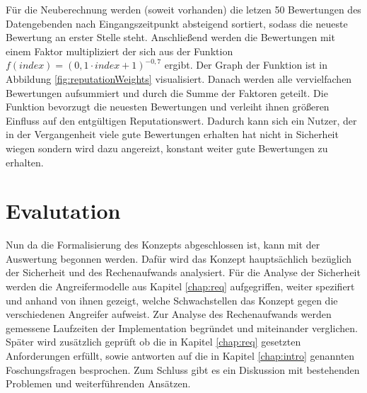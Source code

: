 \documentclass[
	fontsize=12pt,
	headings=small,
	parskip=half,           %
	bibliography=totoc,
	numbers=noenddot,       %
	open=any,               %
]{scrreprt}
\begin{document}
Für die Neuberechnung werden (soweit vorhanden) die letzen 50 Bewertungen des Datengebenden nach Eingangszeitpunkt absteigend sortiert, sodass die neueste Bewertung an erster Stelle steht. Anschließend werden die Bewertungen mit einem Faktor multipliziert der sich aus der Funktion $f(index)=(0,1\cdot index + 1)^{-0,7}$ ergibt. Der Graph der Funktion ist in Abbildung \ref{fig:reputationWeights} visualisiert. Danach werden alle vervielfachen Bewertungen aufsummiert und durch die Summe der Faktoren geteilt. Die Funktion bevorzugt die neuesten Bewertungen und verleiht ihnen größeren Einfluss auf den entgültigen Reputationswert. Dadurch kann sich ein Nutzer, der in der Vergangenheit viele gute Bewertungen erhalten hat nicht in Sicherheit wiegen sondern wird dazu angereizt, konstant weiter gute Bewertungen zu erhalten.






\chapter{Evalutation}
\label{chap:auswertung}
Nun da die Formalisierung des Konzepts abgeschlossen ist, kann mit der Auswertung begonnen werden. Dafür wird das Konzept hauptsächlich bezüglich der Sicherheit und des Rechenaufwands analysiert. Für die Analyse der Sicherheit werden die Angreifermodelle aus Kapitel \ref{chap:req} aufgegriffen, weiter spezifiert und anhand von ihnen gezeigt, welche Schwachstellen das Konzept gegen die verschiedenen Angreifer aufweist. Zur Analyse des Rechenaufwands werden gemessene Laufzeiten der Implementation begründet und miteinander verglichen. Später wird zusätzlich geprüft ob die in Kapitel \ref{chap:req} gesetzten Anforderungen erfüllt, sowie antworten auf die in Kapitel \ref{chap:intro} genannten Foschungsfragen besprochen. Zum Schluss gibt es ein Diskussion mit bestehenden Problemen und weiterführenden Ansätzen.
\end{document}
